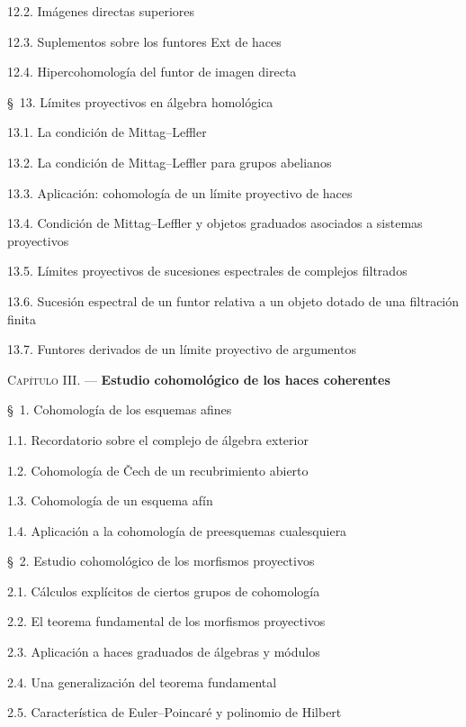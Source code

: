 \begin{flushleft}
12.2. Imágenes directas superiores 

12.3. Suplementos sobre los funtores Ext de haces 

12.4. Hipercohomología del funtor de imagen directa 


\S~13. Límites proyectivos en álgebra homológica 

13.1. La condición de Mittag--Leffler 

13.2. La condición de Mittag--Leffler para grupos abelianos 

13.3. Aplicación: cohomología de un límite proyectivo de haces 

13.4. Condición de Mittag--Leffler y objetos graduados asociados a sistemas
proyectivos 

13.5. Límites proyectivos de sucesiones espectrales de complejos filtrados

13.6. Sucesión espectral de un funtor relativa a un objeto dotado de una
filtración finita 

13.7. Funtores derivados de un límite proyectivo de argumentos 

\medskip
\textsc{Capítulo III.} --- \textbf{Estudio cohomológico de los haces coherentes}

\medskip
\S~1. Cohomología de los esquemas afines 

1.1. Recordatorio sobre el complejo de álgebra exterior 

1.2. Cohomología de \v Cech de un recubrimiento abierto 

1.3. Cohomología de un esquema afín 

1.4. Aplicación a la cohomología de preesquemas cualesquiera 

\medskip
\S~2. Estudio cohomológico de los morfismos proyectivos 

2.1. Cálculos explícitos de ciertos grupos de cohomología 

2.2. El teorema fundamental de los morfismos proyectivos 

2.3. Aplicación a haces graduados de álgebras y módulos 

2.4. Una generalización del teorema fundamental 

2.5. Característica de Euler--Poincaré y polinomio de Hilbert 


\end{flushleft}
